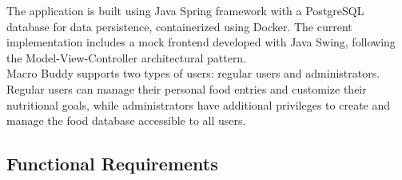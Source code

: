 \documentclass[a4paper,10pt]{article}
\begin{document}
    The application is built using Java Spring framework with a PostgreSQL database for data persistence, containerized using Docker. The current implementation includes a mock frontend developed with Java Swing, following the Model-View-Controller architectural pattern. \\

    Macro Buddy supports two types of users: regular users and administrators. Regular users can manage their personal food entries and customize their nutritional goals, while administrators have additional privileges to create and manage the food database accessible to all users.

    \newpage
    \subsection{Functional Requirements}
\end{document}
